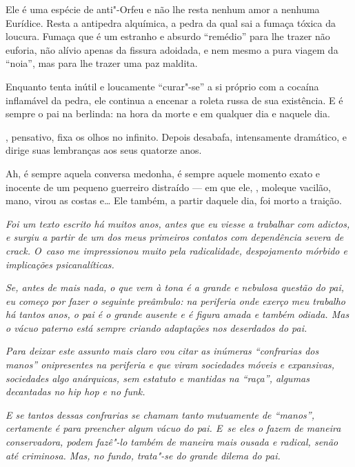 Ele é uma espécie de anti"-Orfeu e não lhe resta nenhum amor a nenhuma
Eurídice. Resta a antipedra alquímica, a pedra da qual sai a fumaça
tóxica da loucura. Fumaça que é um estranho e absurdo ``remédio'' para
lhe trazer não euforia, não alívio apenas da fissura adoidada, e nem
mesmo a pura viagem da ``noia'', mas para lhe trazer uma paz maldita.

Enquanto  tenta inútil e loucamente ``curar"-se'' a si próprio com a
cocaína inflamável da pedra, ele continua a encenar a roleta russa de
sua existência. E é sempre o pai na berlinda: na hora da morte e em
qualquer dia e naquele dia.

, pensativo, fixa os olhos no infinito. Depois desabafa, intensamente
dramático, e dirige suas lembranças aos seus quatorze anos.

Ah, é sempre aquela conversa medonha, é sempre aquele momento exato e
inocente de um pequeno guerreiro distraído --- em que ele, , moleque
vacilão, mano, virou as costas e… Ele também, a partir daquele
dia, foi morto a traição.

\begin{center}\asterisc{}\end{center}
\begingroup\small

\emph{Foi um texto escrito há muitos anos, antes que eu viesse a
trabalhar com adictos, e surgiu a partir de um dos meus primeiros
contatos com dependência severa de crack. O~caso me impressionou muito
pela radicalidade, despojamento mórbido e implicações psicanalíticas.}

\emph{Se, antes de mais nada, o que vem à tona é a grande e nebulosa
questão do pai, eu começo por fazer o seguinte preâmbulo: na periferia
onde exerço meu trabalho há tantos anos, o pai é o grande ausente e é
figura amada e também odiada. Mas o vácuo paterno está sempre criando
adaptações nos deserdados do pai.}

\emph{Para deixar este assunto mais claro vou citar as inúmeras
``confrarias dos manos'' onipresentes na periferia e que viram
sociedades móveis e expansivas, sociedades algo anárquicas, sem estatuto
e mantidas na ``raça'', algumas decantadas no hip hop e no funk.}

\emph{E se tantos dessas confrarias se chamam tanto mutuamente de
``manos'', certamente é para preencher algum vácuo do pai. E~se eles o
fazem de maneira conservadora, podem fazê"-lo também de maneira mais
ousada e radical, senão até criminosa. Mas, no fundo, trata"-se do grande
dilema do pai.}

